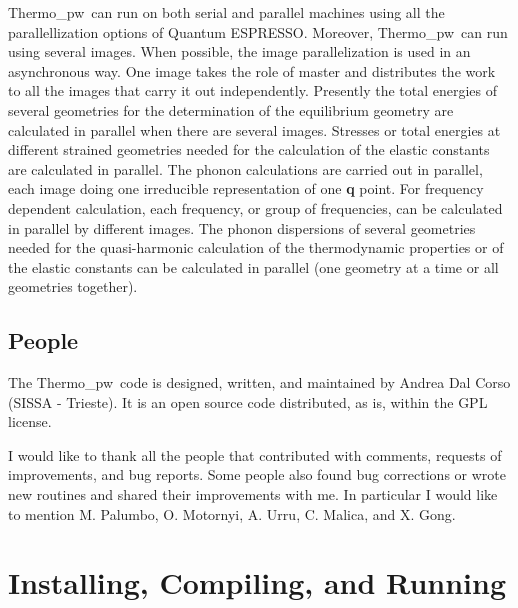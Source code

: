 \documentclass[12pt,a4paper,twoside]{report}
\def\qe{{\sc Quantum ESPRESSO}}
\def\thermo{{\sc Thermo\_pw}}
\begin{document}
\thermo\ can run on both serial and parallel machines using all 
the parallellization options of \qe. Moreover, \thermo\ can run using 
several images.
When possible, the image parallelization is used in an asynchronous way.
One image takes the role of master and distributes the work 
to all the images that carry it out independently. Presently 
the total energies of several geometries for the determination of the 
equilibrium geometry are calculated in parallel when
there are several images. Stresses or total energies at different strained 
geometries needed for the calculation of the elastic constants are 
calculated in parallel. 
The phonon calculations are carried out in parallel, each image doing one 
irreducible representation of one {\bf q} point. For frequency dependent 
calculation, each frequency, or group of frequencies, can be calculated 
in parallel by different images.
The phonon dispersions of several geometries needed
for the quasi-harmonic calculation of the thermodynamic properties or
of the elastic constants can be calculated in parallel (one geometry at 
a time or all geometries together).

\newpage
{\color{coral}\section{People}}
\color{black}
The \thermo\ code is designed, written, and maintained by Andrea Dal Corso 
(SISSA - Trieste). It is an open source code distributed, as is, within the GPL
license.  

I would like to thank all the people that contributed with comments, requests
of improvements, and bug reports. Some people also found bug corrections or
wrote new routines and shared their improvements with me. In particular I would 
like to mention M. Palumbo, O. Motornyi, A. Urru, C. Malica, and X. Gong.

\newpage
{\color{dark-blue}\chapter{Installing, Compiling, and Running}}
\end{document}
